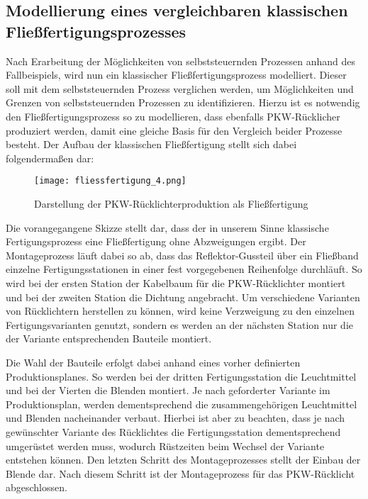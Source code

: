 \subsection{Modellierung eines vergleichbaren klassischen Fließfertigungsprozesses}
\label{Modellierung}

Nach Erarbeitung der Möglichkeiten von selbststeuernden Prozessen anhand des
Fallbeispiels, wird nun ein klassischer Fließfertigungsprozess modelliert.
Dieser soll mit dem selbststeuernden Prozess verglichen werden, um Möglichkeiten
und Grenzen von selbststeuernden Prozessen zu identifizieren. Hierzu ist es
notwendig den Fließfertigungsprozess so zu modellieren, dass ebenfalls
PKW-Rücklicher produziert werden, damit eine gleiche Basis für den Vergleich
beider Prozesse besteht. Der Aufbau der klassischen Fließfertigung stellt sich
dabei folgendermaßen dar:

\begin{figure}[htb] 
\centering
\texttt{[image: fliessfertigung\_4.png]}
\caption[Montagestation]{Darstellung der PKW-Rücklichterproduktion als Fließfertigung\protect\footnotemark}
\label{fig:Fliessfertigung}
\end{figure}

Die vorangegangene Skizze stellt dar, dass der in unserem Sinne klassische
Fertigungsprozess eine Fließfertigung ohne Abzweigungen ergibt. Der
Montageprozess läuft dabei so ab, dass das Reflektor-Gussteil über ein Fließband
einzelne Fertigungsstationen in einer fest vorgegebenen Reihenfolge durchläuft.
So wird bei der ersten Station der Kabelbaum für die PKW-Rücklichter montiert
und bei der zweiten Station die Dichtung angebracht. Um verschiedene Varianten
von Rücklichtern herstellen zu können, wird keine Verzweigung zu den einzelnen
Fertigungsvarianten genutzt, sondern es werden an der nächsten Station nur die
der Variante entsprechenden Bauteile montiert.

Die Wahl der Bauteile erfolgt dabei anhand eines vorher definierten
Produktionsplanes. So werden bei der dritten Fertigungsstation die Leuchtmittel
und bei der Vierten die Blenden montiert. Je nach geforderter Variante im
Produktionsplan, werden dementsprechend die zusammengehörigen Leuchtmittel und
Blenden nacheinander verbaut. Hierbei ist aber zu beachten, dass je nach
gewünschter Variante des Rücklichtes die Fertigungsstation dementsprechend
umgerüstet werden muss, wodurch Rüstzeiten beim Wechsel der Variante entstehen
können. Den letzten Schritt des Montageprozesses stellt der Einbau der Blende
dar. Nach diesem Schritt ist der Montageprozess für das PKW-Rücklicht
abgeschlossen.
 